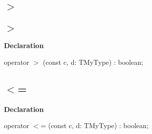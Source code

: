 \documentclass{report}
\newif\ifpdf
\begin{document}
\subsection*{\large{\textbf{{$>$}}}\normalsize\hspace{1ex}\hrulefill}
\else
\subsection*{{$>$}}
\fi
\label{ok_operator_test->}
\index{{$>$}}
\begin{list}{}{
\setlength{\itemindent}{0cm}
\setlength{\listparindent}{0cm}
\setlength{\leftmargin}{\evensidemargin}
\addtolength{\leftmargin}{\tmplength}
\settowidth{\labelsep}{X}
\addtolength{\leftmargin}{\labelsep}
\setlength{\labelwidth}{\tmplength}
}
\item[\textbf{Declaration}\hfill]
\ifpdf
\begin{flushleft}
\fi
\begin{ttfamily}
operator {$>$} (const c, d: TMyType) : boolean;\end{ttfamily}

\ifpdf
\end{flushleft}
\fi

\end{list}
\ifpdf
\subsection*{\large{\textbf{{$<$}=}}\normalsize\hspace{1ex}\hrulefill}
\else
\subsection*{{$<$}=}
\fi
\label{ok_operator_test-<=}
\index{{$<$}=}
\begin{list}{}{
\setlength{\itemindent}{0cm}
\setlength{\listparindent}{0cm}
\setlength{\leftmargin}{\evensidemargin}
\addtolength{\leftmargin}{\tmplength}
\settowidth{\labelsep}{X}
\addtolength{\leftmargin}{\labelsep}
\setlength{\labelwidth}{\tmplength}
}
\item[\textbf{Declaration}\hfill]
\ifpdf
\begin{flushleft}
\fi
\begin{ttfamily}
operator {$<$}= (const c, d: TMyType) : boolean;\end{ttfamily}

\ifpdf
\end{flushleft}
\fi

\end{list}
\ifpdf
\end{document}
